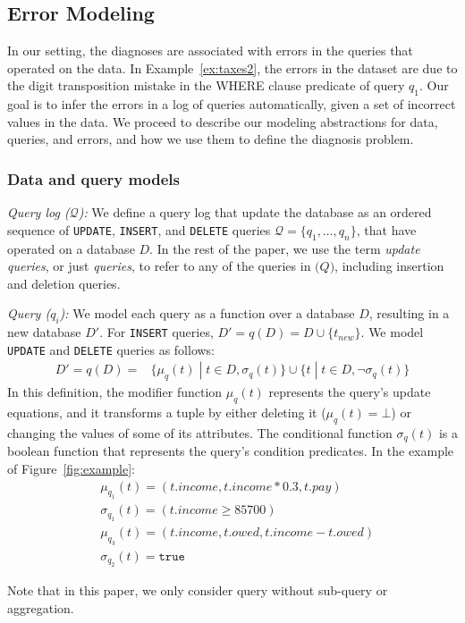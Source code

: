 

\subsection{Error Modeling}
\label{sec:model}

In our setting, the diagnoses are associated with errors in the queries that
operated on the data. In Example~\ref{ex:taxes2}, the errors in the dataset
are due to the digit transposition mistake in the WHERE clause predicate of
query $q_1$. Our goal is to infer the errors in a log of queries
automatically, given a set of incorrect values in the data. We proceed to
describe our modeling abstractions for data, queries, and errors, and how we
use them to define the diagnosis problem.

\subsubsection*{Data and query models}
\label{sec:models}

\noindent
\emph{Query log ($\mathcal{Q}$):}
We define a query log that update the database 
as an ordered sequence of \texttt{UPDATE}, \texttt{INSERT}, and
\texttt{DELETE} queries $\mathcal{Q}=\{q_1,\dots,q_n\}$, that have
operated on a database $D$. In the rest of the paper, we use the term
\emph{update queries}, or just \emph{queries}, to refer to any of the queries in $\mathcal(Q)$,
including insertion and deletion queries.

\smallskip
\noindent
\emph{Query ($q_i$):} We model each query as a function over a
database $D$, resulting in a new database $D'$. For \texttt{INSERT}
queries, $D'=q(D)=D\cup\{t_{new}\}$.
We model \texttt{UPDATE} and \texttt{DELETE} queries as follows:  
\begin{align*}
    D'=q(D)= &\{\mu_{q}(t)\;|\;t\in D, \sigma_{q}(t)\}
    \cup\{t\;|\;t\in D, \neg\sigma_{q}(t)\}
\end{align*}
In this definition, the modifier function $\mu_q(t)$ represents the query's update equations, and it transforms a tuple by either deleting it ($\mu_q(t)=\bot$) or changing the values of some of its attributes.
The conditional function $\sigma_q(t)$ is a boolean function that represents the query's condition predicates.  In the example of Figure~\ref{fig:example}:
\begin{align*}
    &\mu_{q_1}(t)=(t.income, t.income*0.3, t.pay)\\
    &\sigma_{q_1}(t)=(t.income\ge 85700)\\
    &\mu_{q_3}(t)=(t.income, t.owed, t.income-t.owed)\\
    &\sigma_{q_2}(t)=\texttt{true}
\end{align*} 
\iffalse
\begin{align*}
    &\mu_{q_1}(t)=(30, t.income, t.owed)\\
    &\sigma_{q_1}(t)=(t.income\ge 85700)\\
    &\mu_{q_2}(t)=(t.rate, t.income, \frac{t.income\cdot t.rate}{100})\\
    &\sigma_{q_2}(t)=\texttt{true}
\end{align*} 
\fi
Note that in this paper, we only consider query without sub-query or aggregation. 


